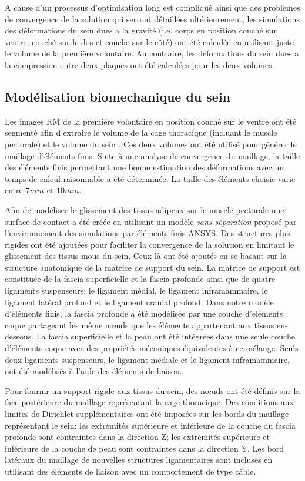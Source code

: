 A cause d'un processus d'optimisation long est compliqué ainsi que des problèmes de convergence de la solution qui serront détaillées ultérieurement, les simulations des déformations du sein dues a la gravité (i.e. corps en position couché sur ventre, couché sur le dos et couche sur le côté) ont été calculée en utilisant juste le volume de la première volontaire. Au contraire, les déformations du sein dues a la compression entre deux plaques ont été calculées pour les deux volumes.

\subsection*{Modélisation biomechanique du sein}

Les images RM de la première volontaire en position couché sur le ventre ont été segmenté afin  d'extraire le volume de la cage thoracique (incluant le muscle pectorale) et le volume du sein . Ces deux volumes ont été utilisé pour générer le maillage d'éléments finis. Suite à une analyse de convergence du maillage, la taille des éléments finis permettant une bonne estimation des déformations avec un temps de calcul raisonnable  a été déterminée. La taille des éléments choisie varie entre $7mm$ et $10mm$.

Afin de modéliser le glissement des tissus adipeux sur le muscle pectorale une surface de contact a été créée en utilisant un modèle \textit{sans-séparation} proposé par l'environnement des simulations par éléments finis ANSYS. Des structures plus rigides ont été ajoutées pour faciliter la convergence de la solution en limitant le glissement des tissus mous du sein. Ceux-là ont été ajoutés en se basant sur la structure anatomique de la matrice de support du sein. La matrice de support est constituée de la fascia superficielle et la fascia profonde ainsi que de quatre ligaments suspenseurs: le ligament médial, le ligament inframammaire, le ligament latéral profond et le ligament cranial profond.  Dans notre modèle d'éléments finis, la fascia profonde a été modélisée par une couche d'éléments coque partageant les même nœuds que les éléments appartenant aux tissus en-dessous. La fascia superficielle et la peau ont été intégrées dans une seule couche d'éléments coque avec des propriétés mécaniques équivalentes à ce mélange. Seuls deux ligaments suspenseurs, le ligament médiale et le ligament inframammaire, ont été modélisés à l'aide des éléments de liaison.


Pour fournir un support rigide aux tissus du sein, des nœuds ont été définis sur la face postérieure du maillage représentant la cage thoracique.
Des conditions aux limites de Dirichlet supplémentaires ont été imposées sur les bords du maillage représentant le sein: les extrémités supérieure et inférieure de la couche du fascia profonde sont contraintes dans la direction Z; les extrémités supérieure et inférieure de la couche de peau sont contraintes dans la direction Y. Les bord latéraux du maillage de nouvelles structures ligamentaires sont incluses en utilisant des éléments de liaison avec un comportement de type câble.

